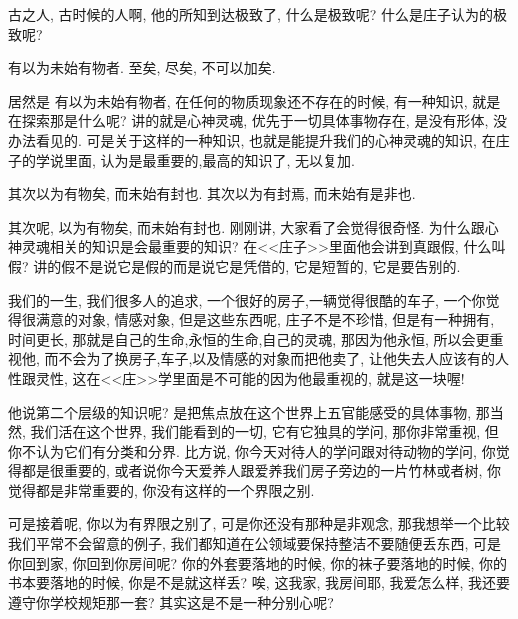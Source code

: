 \documentclass[11pt]{article}
\begin{document}
\vspace{-0.5cm}

古之人, 古时候的人啊, 他的所知到达极致了, 什么是极致呢? 什么是庄子认为的极致呢? 

\begin{center}
	{\color{magenta} 有以为未始有物者. 至矣, 尽矣, 不可以加矣.}
\end{center}

\vspace{-0.5cm}

居然是{\color{blue} 有以为未始有物者}, 在任何的物质现象还不存在的时候, 有一种知识, 就是在探索那是什么呢? 讲的就是心神灵魂, 优先于一切具体事物存在, 是没有形体, 没办法看见的. 可是关于这样的一种知识, 也就是能提升我们的心神灵魂的知识, 在庄子的学说里面, 认为是最重要的,最高的知识了, 无以复加. 

\begin{center}
	{\color{magenta} 其次以为有物矣, 而未始有封也. 其次以为有封焉, 而未始有是非也.}
\end{center}

\vspace{-0.5cm}

其次呢, {\color{blue} 以为有物矣, 而未始有封也}. 刚刚讲, 大家看了会觉得很奇怪. 为什么跟心神灵魂相关的知识是会最重要的知识? 在<<庄子>>里面他会讲到真跟假, 什么叫假? 讲的假不是说它是假的而是说它是凭借的, 它是短暂的, 它是要告别的. 

我们的一生, 我们很多人的追求, 一个很好的房子,一辆觉得很酷的车子, 一个你觉得很满意的对象, 情感对象, 但是这些东西呢, 庄子不是不珍惜, 但是有一种拥有, 时间更长, 那就是自己的生命,永恒的生命,自己的灵魂, 那因为他永恒, 所以会更重视他, 而不会为了换房子,车子,以及情感的对象而把他卖了, 让他失去人应该有的人性跟灵性, 这在<<庄>>学里面是不可能的因为他最重视的, 就是这一块喔! 

他说第二个层级的知识呢? 是把焦点放在这个世界上五官能感受的具体事物, 那当然, 我们活在这个世界, 我们能看到的一切, 它有它独具的学问, 那你非常重视, 但你不认为它们有分类和分界. 比方说, 你今天对待人的学问跟对待动物的学问, 你觉得都是很重要的, 或者说你今天爱养人跟爱养我们房子旁边的一片竹林或者树, 你觉得都是非常重要的, 你没有这样的一个界限之别. 

可是接着呢, 你以为有界限之别了, 可是你还没有那种是非观念, 那我想举一个比较我们平常不会留意的例子, 我们都知道在公领域要保持整洁不要随便丢东西, 可是你回到家, 你回到你房间呢? 你的外套要落地的时候, 你的袜子要落地的时候, 你的书本要落地的时候, 你是不是就这样丢? 唉, 这我家, 我房间耶, 我爱怎么样, 我还要遵守你学校规矩那一套? 其实这是不是一种分别心呢? 
\end{document}
